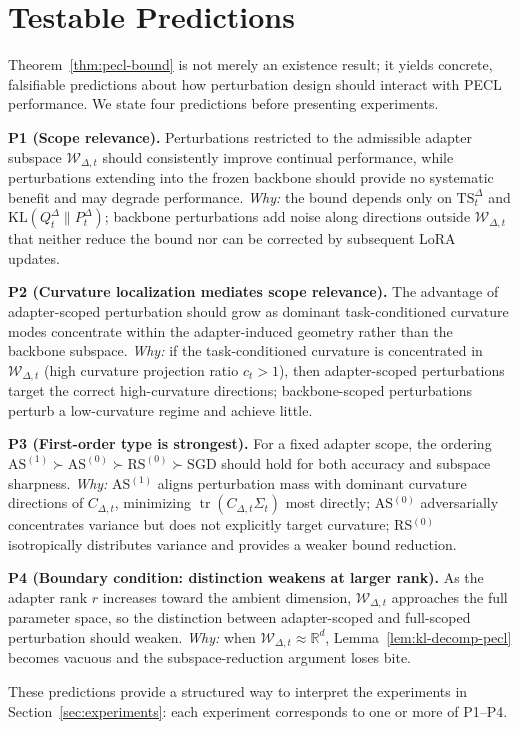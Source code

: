 \section{Testable Predictions}
\label{sec:predictions}

Theorem~\ref{thm:pecl-bound} is not merely an existence result; it yields concrete, falsifiable predictions about how perturbation design should interact with PECL performance.
We state four predictions before presenting experiments.

\textbf{P1 (Scope relevance).}
Perturbations restricted to the admissible adapter subspace $\mathcal{W}_{\Delta,t}$ should consistently improve continual performance, while perturbations extending into the frozen backbone should provide no systematic benefit and may degrade performance.
\emph{Why:} the bound depends only on $\mathrm{TS}_t^\Delta$ and $\mathrm{KL}(Q_t^\Delta \| P_t^\Delta)$; backbone perturbations add noise along directions outside $\mathcal{W}_{\Delta,t}$ that neither reduce the bound nor can be corrected by subsequent LoRA updates.

\textbf{P2 (Curvature localization mediates scope relevance).}
The advantage of adapter-scoped perturbation should grow as dominant task-conditioned curvature modes concentrate within the adapter-induced geometry rather than the backbone subspace.
\emph{Why:} if the task-conditioned curvature is concentrated in $\mathcal{W}_{\Delta,t}$ (high curvature projection ratio $c_t > 1$), then adapter-scoped perturbations target the correct high-curvature directions; backbone-scoped perturbations perturb a low-curvature regime and achieve little.

\textbf{P3 (First-order type is strongest).}
For a fixed adapter scope, the ordering $\mathrm{AS}^{(1)} \succ \mathrm{AS}^{(0)} \succ \mathrm{RS}^{(0)} \succ \mathrm{SGD}$ should hold for both accuracy and subspace sharpness.
\emph{Why:} AS$^{(1)}$ aligns perturbation mass with dominant curvature directions of $C_{\Delta,t}$, minimizing $\operatorname{tr}(C_{\Delta,t}\Sigma_t)$ most directly; AS$^{(0)}$ adversarially concentrates variance but does not explicitly target curvature; RS$^{(0)}$ isotropically distributes variance and provides a weaker bound reduction.

\textbf{P4 (Boundary condition: distinction weakens at larger rank).}
As the adapter rank $r$ increases toward the ambient dimension, $\mathcal{W}_{\Delta,t}$ approaches the full parameter space, so the distinction between adapter-scoped and full-scoped perturbation should weaken.
\emph{Why:} when $\mathcal{W}_{\Delta,t} \approx \mathbb{R}^d$, Lemma~\ref{lem:kl-decomp-pecl} becomes vacuous and the subspace-reduction argument loses bite.

These predictions provide a structured way to interpret the experiments in Section~\ref{sec:experiments}: each experiment corresponds to one or more of P1--P4.
